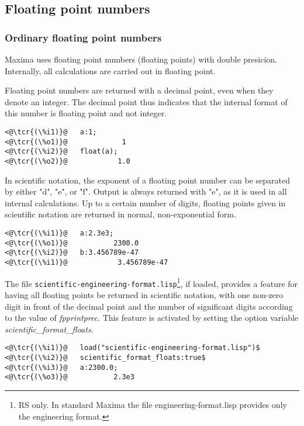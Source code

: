 \documentclass[../Maxima_Workbook.tex]{subfiles}
\begin{document}
\subsection{Floating point numbers}

\subsubsection{Ordinary floating point numbers}

Maxima uses floating point numbers (floating points) with double presicion. Internally, all calculations are carried out in floating point.

\lz Floating point numbers are returned with a decimal point, even when they denote an integer. The decimal point thus indicates that the internal format of this number is floating point and not integer.

\begin{lstlisting}
<@\tcr{(\%i1)}@   a:1;
<@\tcr{(\%o1)}@			    1
<@\tcr{(\%i2)}@   float(a);
<@\tcr{(\%o2)}@			   1.0
\end{lstlisting}

In scientific notation, the exponent of a floating point number can be separated by either "d", "e", or "f". Output is always returned with "e", as it is used in all internal calculations. Up to a certain number of digits, floating points given in scientific notation are returned in normal, non-exponential form.

\begin{lstlisting}
<@\tcr{(\%i1)}@   a:2.3e3;
<@\tcr{(\%o1)}@			  2300.0
<@\tcr{(\%i2)}@   b:3.456789e-47
<@\tcr{(\%i1)}@		       3.456789e-47
\end{lstlisting}

The file \verb|scientific-engineering-format.lisp|\footnote{RS only. In standard Maxima the file engineering-format.lisp provides only the engineering format.}, if loaded, provides a feature for having all floating points be returned in scientific notation, with one non-zero digit in front of the decimal point and the number of significant digits according to the value of \emph{fpprintprec}. This feature is activated by setting the option variable \emph{scientific\_format\_floats}.

\begin{lstlisting}
<@\tcr{(\%i1)}@   load("scientific-engineering-format.lisp")$
<@\tcr{(\%i2)}@   scientific_format_floats:true$
<@\tcr{(\%i3)}@   a:2300.0;
<@\tcr{(\%o3)}@			  2.3e3
\end{lstlisting}
\end{document}
